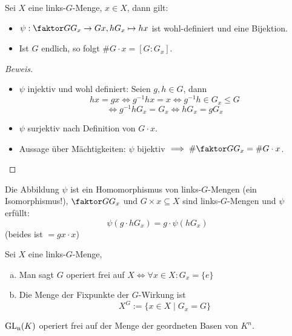 \documentclass[a4paper]{report}
\begin{document}
\begin{prop}[Bahngleichung]
  Sei $X$ eine links-$G$-Menge, $x \in X$, dann gilt:
  \begin{itemize}
    \item $\psi : \fak{G}{G_{x}} \to Gx, hG_{x} \mapsto hx$ ist wohl-definiert und eine Bijektion.
    \item Ist $G$ endlich, so folgt $\# G\cdot x = [G : G_{x}]$.
  \end{itemize}
\end{prop}
\begin{proof}[Beweis] \item
  \begin{itemize}
    \item $\psi$ injektiv und wohl definiert: Seien $g, h \in G$, dann
          \[hx = gx \iff g^{-1}hx = x \iff g^{-1}h \in G_{x} \le G\]
          \[\iff g^{-1}h G_{x} = G_{x} \iff hG_{x} = gG_x\]
    \item $\psi$ surjektiv nach Definition von $G\cdot x$.
    \item Aussage über Mächtigkeiten: $\psi$ bijektiv $\imp \# \fak G{G_{x}} = \#G \cdot x$.
  \end{itemize}
\end{proof}

\begin{bem*} Die Abbildung $\psi$ ist ein Homomorphismus von links-$G$-Mengen (ein Isomorphismus!), $\fak G{G_{x}}$ und $G \times x \subseteq X$ sind links-$G$-Mengen und $\psi$ erfüllt:
  \[\psi (g \cdot h G_{x}) = g\cdot  \psi (hG_{x})\]
  (beides ist $=gx \cdot x$)
\end{bem*}


\begin{defi}%
  Sei $X$ eine links-$G$-Menge,
  \begin{enumerate}[(a)]
    \item Man sagt $G$ operiert frei auf $X \iff \forall x \in X : G_{x} = \{e\}$
    \item Die Menge der Fixpunkte der $G$-Wirkung ist \[X^{G} := \{x \in X \mid G_{x} = G\}\]
  \end{enumerate}
\end{defi}

\begin{bsp*}
$\operatorname{GL_n}(K)$ operiert frei auf der Menge der geordneten Basen von $K^{n}$.
\end{bsp*}
\end{document}
